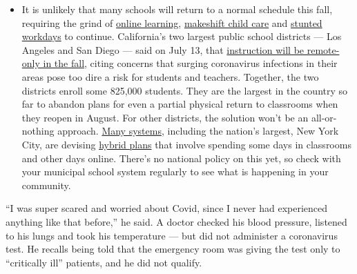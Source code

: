 \begin{itemize}
  \begin{itemize}
  \tightlist
  \item
    It is unlikely that many schools will return to a normal schedule
    this fall, requiring the grind of
    \href{https://www.nytimes3xbfgragh.onion/2020/06/05/us/coronavirus-education-lost-learning.html?action=click\&pgtype=Article\&state=default\&region=MAIN_CONTENT_3\&context=storylines_faq}{online
    learning},
    \href{https://www.nytimes3xbfgragh.onion/2020/05/29/us/coronavirus-child-care-centers.html?action=click\&pgtype=Article\&state=default\&region=MAIN_CONTENT_3\&context=storylines_faq}{makeshift
    child care} and
    \href{https://www.nytimes3xbfgragh.onion/2020/06/03/business/economy/coronavirus-working-women.html?action=click\&pgtype=Article\&state=default\&region=MAIN_CONTENT_3\&context=storylines_faq}{stunted
    workdays} to continue. California's two largest public school
    districts --- Los Angeles and San Diego --- said on July 13, that
    \href{https://www.nytimes3xbfgragh.onion/2020/07/13/us/lausd-san-diego-school-reopening.html?action=click\&pgtype=Article\&state=default\&region=MAIN_CONTENT_3\&context=storylines_faq}{instruction
    will be remote-only in the fall}, citing concerns that surging
    coronavirus infections in their areas pose too dire a risk for
    students and teachers. Together, the two districts enroll some
    825,000 students. They are the largest in the country so far to
    abandon plans for even a partial physical return to classrooms when
    they reopen in August. For other districts, the solution won't be an
    all-or-nothing approach.
    \href{https://bioethics.jhu.edu/research-and-outreach/projects/eschool-initiative/school-policy-tracker/}{Many
    systems}, including the nation's largest, New York City, are
    devising
    \href{https://www.nytimes3xbfgragh.onion/2020/06/26/us/coronavirus-schools-reopen-fall.html?action=click\&pgtype=Article\&state=default\&region=MAIN_CONTENT_3\&context=storylines_faq}{hybrid
    plans} that involve spending some days in classrooms and other days
    online. There's no national policy on this yet, so check with your
    municipal school system regularly to see what is happening in your
    community.
  \end{itemize}
\end{itemize}

``I was super scared and worried about Covid, since I never had
experienced anything like that before,'' he said. A doctor checked his
blood pressure, listened to his lungs and took his temperature --- but
did not administer a coronavirus test. He recalls being told that the
emergency room was giving the test only to ``critically ill'' patients,
and he did not qualify.

